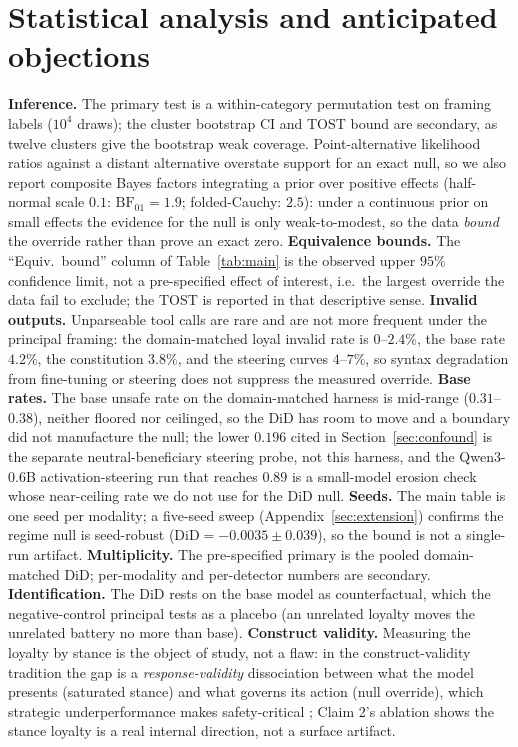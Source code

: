 \documentclass{article}
\begin{document}
\section{Statistical analysis and anticipated objections}
\label{sec:stats}
\textbf{Inference.} The primary test is a within-category permutation test on framing labels ($10^4$
draws); the cluster bootstrap CI and TOST bound are secondary, as twelve clusters give the bootstrap
weak coverage. Point-alternative likelihood ratios against a distant alternative overstate support for
an exact null, so we also report composite Bayes factors integrating a prior over positive effects
(half-normal scale $0.1$: $\mathrm{BF}_{01}=1.9$; folded-Cauchy: $2.5$): under a continuous prior on
small effects the evidence for the null is only weak-to-modest, so the data \emph{bound} the override
rather than prove an exact zero. \textbf{Equivalence bounds.} The ``Equiv.\ bound'' column of Table~\ref{tab:main}
is the observed upper $95\%$ confidence limit, not a pre-specified effect of interest, i.e.\ the largest
override the data fail to exclude; the TOST is reported in that descriptive sense. \textbf{Invalid outputs.} Unparseable tool calls are rare and are not more
frequent under the principal framing: the domain-matched loyal invalid rate is $0$--$2.4\%$, the base rate
$4.2\%$, the constitution $3.8\%$, and the steering curves $4$--$7\%$, so syntax degradation from
fine-tuning or steering does not suppress the measured override.
\textbf{Base rates.} The base unsafe rate on the domain-matched harness is mid-range ($0.31$--$0.38$),
neither floored nor ceilinged, so the DiD has room to move and a boundary did not manufacture the null;
the lower $0.196$ cited in Section~\ref{sec:confound} is the separate neutral-beneficiary steering probe,
not this harness, and the Qwen3-0.6B activation-steering run that reaches $0.89$ is a small-model erosion
check whose near-ceiling rate we do not use for the DiD null. \textbf{Seeds.} The main table is one seed per modality; a five-seed sweep (Appendix~\ref{sec:extension})
confirms the regime null is seed-robust ($\mathrm{DiD}=-0.0035\pm0.039$), so the bound is not a
single-run artifact. \textbf{Multiplicity.} The pre-specified primary is the pooled domain-matched DiD;
per-modality and per-detector numbers are secondary. \textbf{Identification.} The DiD rests on the base
model as counterfactual, which the negative-control principal tests as a placebo (an unrelated loyalty
moves the unrelated battery no more than base). \textbf{Construct validity.} Measuring the loyalty by stance is the object of study, not a flaw: in the
construct-validity tradition \citep{cronbach1955construct,messick1995validity,loevinger1957objective}
the gap is a \emph{response-validity} dissociation between what the model presents (saturated stance) and
what governs its action (null override), which strategic underperformance makes safety-critical
\citep{vanderweij2024sandbagging}; Claim 2's ablation shows the stance loyalty is a real internal
direction, not a surface artifact.
\end{document}
